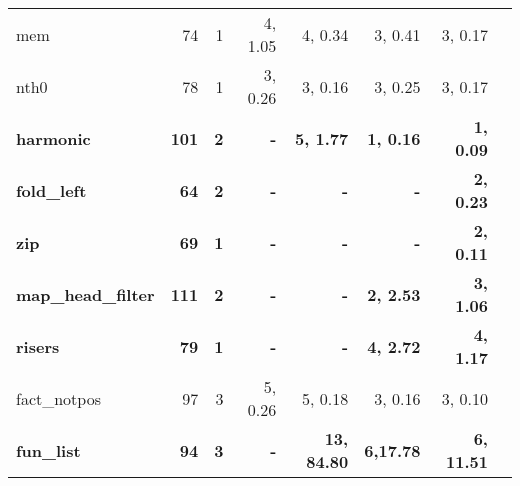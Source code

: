 \begin{table}
\begin{center}
\begin{tabular}{|l|r|r|r|r|r|r|r|}
 mem               &  74 & 1 & 4, 1.05 & 4, 0.34 & 3, 0.41 & 3, 0.17 \\
 nth0              &  78 & 1 & 3, 0.26 & 3, 0.16 & 3, 0.25 & 3, 0.17 \\
\bf harmonic          &\bf 101 &\bf 2 &\bf       - &\bf 5, 1.77 &\bf 1, 0.16 &\bf 1, 0.09 \\
\bf fold\_left        &\bf  64 &\bf 2 &\bf       - &\bf       - &\bf       - &\bf 2, 0.23 \\
\bf zip               &\bf  69 &\bf 1 &\bf       - &\bf       - &\bf       - &\bf 2, 0.11 \\
\bf map\_head\_filter &\bf 111 &\bf 2 &\bf       - &\bf       - &\bf 2, 2.53 &\bf 3, 1.06 \\
\bf risers            &\bf  79 &\bf 1 &\bf       - &\bf       - &\bf 4, 2.72 &\bf 4, 1.17 \\
 fact\_notpos      &  97 & 3 & 5, 0.26 & 5, 0.18 & 3, 0.16 & 3, 0.10 \\
\bf fun\_list         &\bf   94&\bf 3 &\bf       - &\bf 13, 84.80 &\bf 6,17.78 &\bf 6, 11.51 \\
\hline
\end{tabular}
\end{center}
\end{table}

